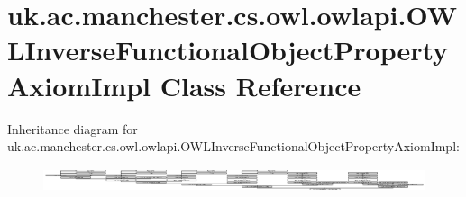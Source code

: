 \hypertarget{classuk_1_1ac_1_1manchester_1_1cs_1_1owl_1_1owlapi_1_1_o_w_l_inverse_functional_object_property_axiom_impl}{\section{uk.\-ac.\-manchester.\-cs.\-owl.\-owlapi.\-O\-W\-L\-Inverse\-Functional\-Object\-Property\-Axiom\-Impl Class Reference}
\label{classuk_1_1ac_1_1manchester_1_1cs_1_1owl_1_1owlapi_1_1_o_w_l_inverse_functional_object_property_axiom_impl}
}
Inheritance diagram for uk.\-ac.\-manchester.\-cs.\-owl.\-owlapi.\-O\-W\-L\-Inverse\-Functional\-Object\-Property\-Axiom\-Impl\-:\begin{figure}[H]
\begin{center}
\leavevmode
\includegraphics[height=0.706179cm]{classuk_1_1ac_1_1manchester_1_1cs_1_1owl_1_1owlapi_1_1_o_w_l_inverse_functional_object_property_axiom_impl}
\end{center}
\end{figure}
